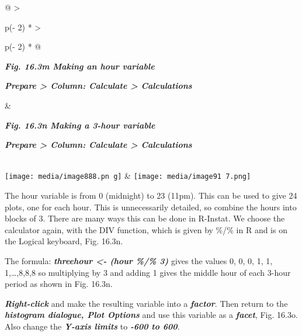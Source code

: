 \documentclass[
  letterpaper,
  DIV=11,
  numbers=noendperiod]{scrreprt}
\begin{document}
\begin{longtable}[]{@{}
  >{\raggedright\arraybackslash}p{(\columnwidth - 2\tabcolsep) * }
  >{\raggedright\arraybackslash}p{(\columnwidth - 2\tabcolsep) * }@{}}
\toprule\noalign{}
\begin{minipage}[b]{\linewidth}\raggedright
\textbf{\emph{Fig. 16.3m Making an hour variable}}

\textbf{\emph{Prepare \textgreater{} Column: Calculate \textgreater{}
Calculations}}
\end{minipage} & \begin{minipage}[b]{\linewidth}\raggedright
\textbf{\emph{Fig. 16.3n Making a 3-hour variable}}

\textbf{\emph{Prepare \textgreater{} Column: Calculate \textgreater{}
Calculations}}
\end{minipage} \\
\midrule\noalign{}
\endhead
\bottomrule\noalign{}
\endlastfoot
\texttt{[image: media/image888.pn g]}
&
\texttt{[image: media/image91 7.png]} \\
\end{longtable}

The hour variable is from 0 (midnight) to 23 (11pm). This can be used to
give 24 plots, one for each hour. This is unnecessarily detailed, so
combine the hours into blocks of 3. There are many ways this can be done
in R-Instat. We choose the calculator again, with the DIV function,
which is given by \%/\% in R and is on the Logical keyboard, Fig. 16.3n.

The formula: \textbf{\emph{threehour \textless- (hour \%/\% 3)}} gives
the values 0, 0, 0, 1, 1, 1,\ldots,8,8,8 so multiplying by 3 and adding
1 gives the middle hour of each 3-hour period as shown in Fig. 16.3n.

\textbf{\emph{Right-click}} and make the resulting variable into a
\textbf{\emph{factor}}. Then return to the \textbf{\emph{histogram
dialogue, Plot Options}} and use this variable as a
\textbf{\emph{facet}}, Fig. 16.3o. Also change the \textbf{\emph{Y-axis
limits}} to \textbf{\emph{-600 to 600}}.
\end{document}
